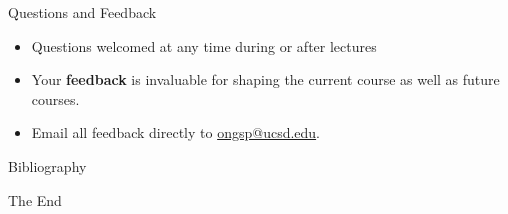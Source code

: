 \documentclass[aspectratio=169]{beamer}
\begin{document}
\begin{frame}{Questions and Feedback}
    \begin{itemize}
        \item Questions welcomed at any time during or after lectures
        \item Your \textbf{feedback} is invaluable for shaping the current course as well as future courses. 
        \item Email all feedback directly to \href{mailto:ongsp@ucsd.edu}{ongsp@ucsd.edu}.
    \end{itemize}
\end{frame}

\begin{frame}[allowframebreaks]{Bibliography}
    
    
\end{frame}



\begin{frame}
    \Huge{\centerline{The End}}
\end{frame}
\end{document}

